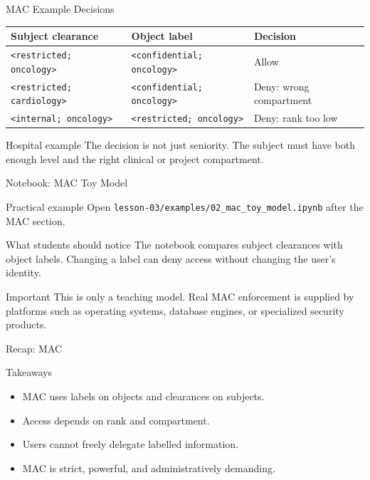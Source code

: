 \documentclass[presentation]{beamer}
\begin{document}
\begin{frame}[c]{MAC Example Decisions}
\begin{center}
\scriptsize
\renewcommand{\arraystretch}{1.2}
\begin{tabular}{p{} p{} p{}}
\toprule
Subject clearance & Object label & Decision \\
\midrule
\texttt{<restricted; oncology>} & \texttt{<confidential; oncology>} & Allow \\
\texttt{<restricted; cardiology>} & \texttt{<confidential; oncology>} & Deny: wrong compartment \\
\texttt{<internal; oncology>} & \texttt{<restricted; oncology>} & Deny: rank too low \\
\bottomrule
\end{tabular}
\end{center}

\begin{exampleblock}{Hospital example}
The decision is not just seniority. The subject must have both enough level and the right clinical
or project compartment.
\end{exampleblock}
\end{frame}

\begin{frame}[c]{Notebook: MAC Toy Model}
\begin{block}{Practical example}
Open \texttt{lesson-03/examples/02\_mac\_toy\_model.ipynb} after the MAC section.
\end{block}

\begin{exampleblock}{What students should notice}
The notebook compares subject clearances with object labels. Changing a label can deny access
without changing the user's identity.
\end{exampleblock}

\begin{block}{Important}
This is only a teaching model. Real MAC enforcement is supplied by platforms such as operating
systems, database engines, or specialized security products.
\end{block}
\end{frame}

\begin{frame}[c]{Recap: MAC}
\begin{block}{Takeaways}
\begin{itemize}
    \item MAC uses labels on objects and clearances on subjects.
    \item Access depends on rank and compartment.
    \item Users cannot freely delegate labelled information.
    \item MAC is strict, powerful, and administratively demanding.
\end{itemize}
\end{block}
\end{frame}
\end{document}
